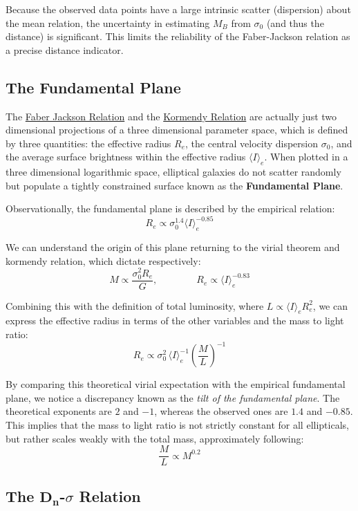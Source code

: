\smallskip

Because the observed data points have a large intrinsic scatter (dispersion) about the mean relation, the uncertainty in estimating $M_B$ from $\sigma_0$ (and thus the distance) is significant. This limits the reliability of the Faber-Jackson relation as a precise distance indicator.

\subsection{The Fundamental Plane}

The \href{subsec:fj-rel}{Faber Jackson Relation} and the \href{subsec:kormendy-rel}{Kormendy Relation} are actually just two dimensional projections of a three dimensional parameter space, which is defined by three quantities: the effective radius $R_e$, the central velocity dispersion $\sigma_0$, and the average surface brightness within the effective radius $\langle I \rangle_e$. When plotted in a three dimensional logarithmic space, elliptical galaxies do not scatter randomly but populate a tightly constrained surface known as the \textbf{Fundamental Plane}.

Observationally, the fundamental plane is described by the empirical relation:
$$
R_e \propto \sigma_0^{1.4} \langle I \rangle_e^{-0.85}
$$

We can understand the origin of this plane returning to the virial theorem and kormendy relation, which dictate respectively:
$$
M \propto \frac{\sigma_0^2 R_e}{G}, \qquad \qquad R_e \propto \langle I \rangle_e^{-0.83}
$$

Combining this with the definition of total luminosity, where $L \propto \langle I \rangle_e R_e^2$, we can express the effective radius in terms of the other variables and the mass to light ratio:
$$
R_e \propto \sigma_0^2 \, \langle I \rangle_e^{-1} \left( \frac{M}{L} \right)^{-1}
$$

By comparing this theoretical virial expectation with the empirical fundamental plane, we notice a discrepancy known as the \textit{tilt of the fundamental plane}. The theoretical exponents are $2$ and $-1$, whereas the observed ones are $1.4$ and $-0.85$. This implies that the mass to light ratio is not strictly constant for all ellipticals, but rather scales weakly with the total mass, approximately following:
$$
\frac{M}{L} \propto M^{0.2}
$$


\subsection{The $\mathbf{D_n}$-$\sigma$ Relation}

